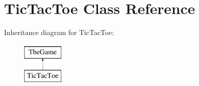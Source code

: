 \hypertarget{class_tic_tac_toe}{\section{Tic\+Tac\+Toe Class Reference}
\label{class_tic_tac_toe}
}
Inheritance diagram for Tic\+Tac\+Toe\+:\begin{figure}[H]
\begin{center}
\leavevmode
\includegraphics[height=2.000000cm]{class_tic_tac_toe}
\end{center}
\end{figure}
